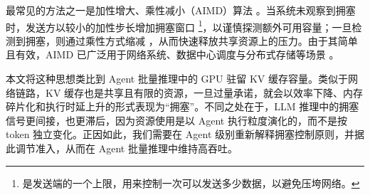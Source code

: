最常见的方法之一是加性增大、乘性减小（AIMD）算法 \cite{chiu1989analysis,AIMD1}。当系统未观察到拥塞时，发送方以较小的加性步长增加拥塞窗口 \cwnd\footnote{\cwnd 是发送端的一个上限，用来控制一次可以发送多少数据，以避免压垮网络。}，以谨慎探测额外可用容量；一旦检测到拥塞，则通过乘性方式缩减 \cwnd，从而快速释放共享资源上的压力。由于其简单且有效，AIMD 已广泛用于网络系统、数据中心调度与分布式存储等场景 \cite{tcp}。

本文将这种思想类比到 Agent 批量推理中的 GPU 驻留 KV 缓存容量。类似于网络链路，KV 缓存也是共享且有限的资源，一旦过量承诺，就会以效率下降、内存碎片化和执行时延上升的形式表现为“拥塞”。不同之处在于，LLM 推理中的拥塞信号更间接，也更滞后，因为资源使用是以 Agent 执行粒度演化的，而不是按 token 独立变化。正因如此，我们需要在 Agent 级别重新解释拥塞控制原则，并据此调节准入，从而在 Agent 批量推理中维持高吞吐。
